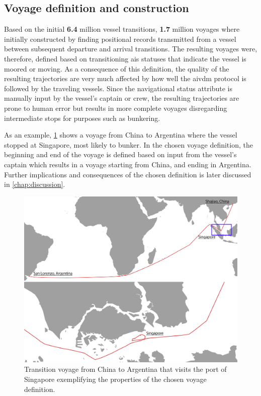 \subsection{Voyage definition and construction}
\label{sec:results_voyage_definition}

Based on the initial \textbf{6.4} million vessel transitions, \textbf{1.7} million voyages where initially constructed by finding positional records transmitted from a vessel between subsequent departure and arrival transitions. The resulting voyages were, therefore, defined based on transitioning \acrshort{ais} statuses that indicate the vessel is moored or moving. As a consequence of this definition, the quality of the resulting trajectories are very much affected by how well the \gls{aivdm} protocol is followed by the traveling vessels. Since the navigational status attribute is manually input by the vessel's captain or crew, the resulting trajectories are prone to human error but results in more complete voyages disregarding intermediate stops for purposes such as bunkering.

As an example, \cref{fig:transition_voyage} shows a voyage from China to Argentina where the vessel stopped at Singapore, most likely to bunker. In the chosen voyage definition, the beginning and end of the voyage is defined based on input from the vessel's captain which results in a voyage starting from China, and ending in Argentina. Further implications and consequences of the chosen definition is later discussed in \cref{chap:discussion}.

\begin{figure}[htbp]
    \centering
    \includegraphics[width=1.0\textwidth]{figures/results/voyage_quality}
    \caption{Transition voyage from China to Argentina that visits the port of Singapore exemplifying the properties of the chosen voyage definition.}
    \label{fig:transition_voyage}
\end{figure}

